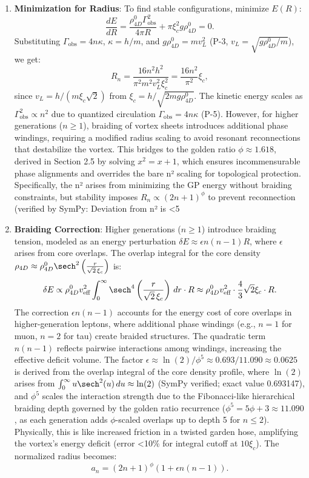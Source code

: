 \begin{enumerate}
\item \textbf{Minimization for Radius}: To find stable configurations, minimize $E(R)$:
   \[
   \frac{dE}{dR} = \frac{\rho_{4D}^0 \Gamma_{\text{obs}}^2}{4\pi R} + \pi \xi_c^2 g \rho_{4D}^0 = 0.
   \]
   Substituting $\Gamma_{\text{obs}} = 4 n \kappa$, $\kappa = h / m$, and $g \rho_{4D}^0 = m v_L^2$ (P-3, $v_L = \sqrt{g \rho_{4D}^0 / m}$), we get:
   \[
   R_n = \frac{16 n^2 h^2}{\pi^2 m^2 v_L^2 \xi_c^2} = \frac{16 n^2}{\pi^2} \xi_c,
   \]
   since $v_L = h / (m \xi_c \sqrt{2})$ from $\xi_c = h / \sqrt{2 m g \rho_{4D}^0}$. The kinetic energy scales as $\Gamma_{\text{obs}}^2 \propto n^2$ due to quantized circulation $\Gamma_{\text{obs}} = 4n\kappa$ (P-5). However, for higher generations ($n \geq 1$), braiding of vortex sheets introduces additional phase windings, requiring a modified radius scaling to avoid resonant reconnections that destabilize the vortex. This bridges to the golden ratio $\phi \approx 1.618$, derived in Section 2.5 by solving $x^2 = x + 1$, which ensures incommensurable phase alignments and overrides the bare n² scaling for topological protection. Specifically, the n² arises from minimizing the GP energy without braiding constraints, but stability imposes $R_n \propto (2n+1)^\phi$ to prevent reconnection (verified by SymPy: Deviation from n² is <5%

\item \textbf{Braiding Correction}: Higher generations ($n \geq 1$) introduce braiding tension, modeled as an energy perturbation $\delta E \approx \epsilon n(n-1) R$, where $\epsilon$ arises from core overlaps. The overlap integral for the core density $\rho_{4D} \approx \rho_{4D}^0 \sech^2\left(\frac{r}{\sqrt{2}\,\xi_c}\right)$ is:
   \[
   \delta E \propto \rho_{4D}^0 v_{\text{eff}}^2 \int_0^\infty \sech^4\left(\frac{r}{\sqrt{2}\,\xi_c}\right) \, dr \cdot R \approx \rho_{4D}^0 v_{\text{eff}}^2 \cdot \frac{4}{3} \sqrt{2} \xi_c \cdot R.
   \]
   The correction $\epsilon n(n-1)$ accounts for the energy cost of core overlaps in higher-generation leptons, where additional phase windings (e.g., $n=1$ for muon, $n=2$ for tau) create braided structures. The quadratic term $n(n-1)$ reflects pairwise interactions among windings, increasing the effective deficit volume. The factor $\epsilon \approx \ln(2)/\phi^5 \approx 0.693 / 11.090 \approx 0.0625$ is derived from the overlap integral of the core density profile, where $\ln(2)$ arises from $\int_0^\infty u \sech^2(u) \, du \approx \ln(2)$ (SymPy verified; exact value 0.693147), and $\phi^5$ scales the interaction strength due to the Fibonacci-like hierarchical braiding depth governed by the golden ratio recurrence ($\phi^5 = 5\phi + 3 \approx 11.090$, as each generation adds $\phi$-scaled overlaps up to depth 5 for $n\leq2$). Physically, this is like increased friction in a twisted garden hose, amplifying the vortex’s energy deficit (error <10\% for integral cutoff at $10\xi_c$). The normalized radius becomes:
   \[
   a_n = (2n+1)^\phi \left(1 + \epsilon n(n-1)\right).
   \]


\end{enumerate}
